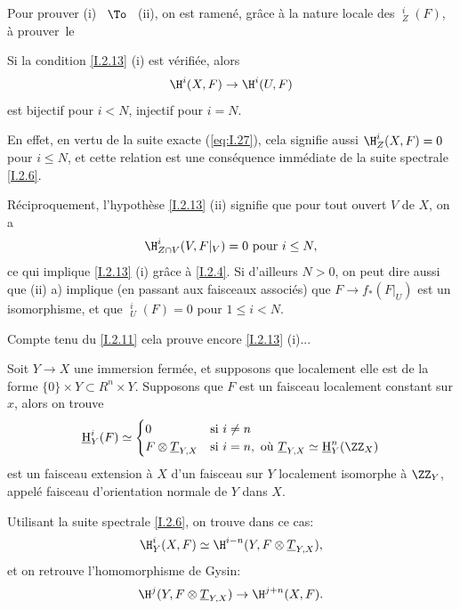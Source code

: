 Pour prouver (i) ~$\To$~ (ii), on est ramen\'e, gr\^ace \`a la nature locale des $\mathop{\underline{\mathrm{H}}}\nolimits_Z^i(F)$, \`a prouver~le

\begin{corollaire} \label{I.2.14}
Si la condition \ref{I.2.13} (i) est v\'erifi\'ee, alors
$$
\H^i(X, F) \to \H^i(U, F)$$
est bijectif pour $i<N$, injectif pour $i=N$.
\end{corollaire}

En effet, en vertu de la suite exacte (\ref{eq:I.27}), cela signifie aussi $\H^i_Z(X, F)=0$ pour $i\leq N$, et cette relation est une cons\'equence imm\'ediate de la suite spectrale \ref{I.2.6}.

R\'eciproquement, l'hypoth\`ese \ref{I.2.13} (ii) signifie que pour tout ouvert $V$ de $X$, on a
$$
\H^i_{Z\cap V}(V, F|_{V}) =0 \text{ pour } i\leq N,
$$
ce qui implique \ref{I.2.13} (i) gr\^ace \`a \ref{I.2.4}. Si d'ailleurs $N>0$, on peut dire aussi que (ii) a) implique (en passant aux faisceaux associ\'es) que $F \to f_*(F|_{U})$ est un isomorphisme, et que $\mathop{\underline{\mathrm{H}}}\nolimits_U^i(F)=0 $ pour $1\leq i<N$.

Compte tenu du \ref{I.2.11} cela prouve encore \ref{I.2.13} (i)...

\begin{remarquestar}
Soit $Y \to X$ une immersion ferm\'ee, et supposons que localement elle est de la forme $\{0\}\times Y \subset R^n \times Y$. Supposons que $F$ est un faisceau localement constant sur $x$, alors on trouve
\begin{equation} \label{eq:I.30}
\mathop{\underline{\mathrm{H}}}\nolimits_Y^i (F)\simeq
\begin{cases}
0 &\text{si } i \neq n\\
F\otimes \underline{T}_{Y, X}& \text{si } i=n, \text{ où } \underline{T}_{Y, X} \simeq \mathop{\underline{\mathrm{H}}}\nolimits_Y^n(\ZZ_X)
\end{cases}
\end{equation}
est un faisceau extension \`a $X$ d'un faisceau sur $Y$ localement isomorphe \`a $\ZZ_Y$, appel\'e \og faisceau d'orientation normale de $Y$ dans $X$\fg.
\end{remarquestar}

Utilisant la suite spectrale \ref{I.2.6}, on trouve dans ce cas:
\begin{equation} \label{eq:I.31}
\H^i_Y(X, F)\simeq \H^{i-n}(Y, F\otimes \underline{T}_{Y, X}),
\end{equation}
et on retrouve l'\og homomorphisme de Gysin\label{hgysin}\fg:
\begin{equation} \label{eq:I.32} {\H^j(Y, F\otimes \underline{T}_{Y, X}) \to \H^{j+n}(X, F)}.
\end{equation}

